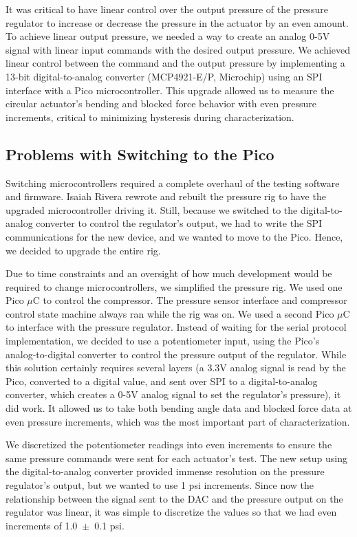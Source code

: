 It was critical to have linear control over the output pressure of the pressure regulator to increase or decrease the pressure in the actuator by an even amount. To achieve linear output pressure, we needed a way to create an analog 0-5V signal with linear input commands with the desired output pressure. We achieved linear control between the command and the output pressure by implementing a 13-bit digital-to-analog converter (MCP4921-E/P, Microchip) using an SPI interface with a Pico microcontroller. This upgrade allowed us to measure the circular actuator's bending and blocked force behavior with even pressure increments, critical to minimizing hysteresis during characterization. 

\subsection{Problems with Switching to the Pico}

Switching microcontrollers required a complete overhaul of the testing software and firmware. Isaiah Rivera rewrote and rebuilt the pressure rig to have the upgraded microcontroller driving it. Still, because we switched to the digital-to-analog converter to control the regulator's output, we had to write the SPI communications for the new device, and we wanted to move to the Pico. Hence, we decided to upgrade the entire rig. 

Due to time constraints and an oversight of how much development would be required to change microcontrollers, we simplified the pressure rig. We used one Pico $\mu$C to control the compressor. The pressure sensor interface and compressor control state machine always ran while the rig was on. We used a second Pico $\mu$C to interface with the pressure regulator. Instead of waiting for the serial protocol implementation, we decided to use a potentiometer input, using the Pico's analog-to-digital converter to control the pressure output of the regulator. While this solution certainly requires several layers (a 3.3V analog signal is read by the Pico, converted to a digital value, and sent over SPI to a digital-to-analog converter, which creates a 0-5V analog signal to set the regulator's pressure), it did work. It allowed us to take both bending angle data and blocked force data at even pressure increments, which was the most important part of characterization. 

We discretized the potentiometer readings into even increments to ensure the same pressure commands were sent for each actuator's test. The new setup using the digital-to-analog converter provided immense resolution on the pressure regulator's output, but we wanted to use 1 psi increments. Since now the relationship between the signal sent to the DAC and the pressure output on the regulator was linear, it was simple to discretize the values so that we had even increments of 1.0~$\pm$~0.1 psi. 

